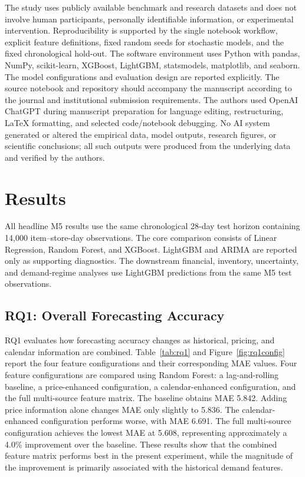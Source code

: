 The study uses publicly available benchmark and research datasets and does not involve human participants, personally identifiable information, or experimental intervention.
Reproducibility is supported by the single notebook workflow, explicit feature definitions, fixed random seeds for stochastic models, and the fixed chronological hold-out.
The software environment uses Python with pandas, NumPy, scikit-learn, XGBoost, LightGBM, statsmodels, matplotlib, and seaborn.
The model configurations and evaluation design are reported explicitly.
The source notebook and repository should accompany the manuscript according to the journal and institutional submission requirements.
The authors used OpenAI ChatGPT during manuscript preparation for language editing, restructuring, LaTeX formatting, and selected code/notebook debugging. No AI system generated or altered the empirical data, model outputs, research figures, or scientific conclusions; all such outputs were produced from the underlying data and verified by the authors.

\section{Results}

All headline M5 results use the same chronological 28-day test horizon containing 14,000 item--store-day observations.
The core comparison consists of Linear Regression, Random Forest, and XGBoost.
LightGBM and ARIMA are reported only as supporting diagnostics.
The downstream financial, inventory, uncertainty, and demand-regime analyses use LightGBM predictions from the same M5 test observations.

\subsection{RQ1: Overall Forecasting Accuracy}

RQ1 evaluates how forecasting accuracy changes as historical, pricing, and calendar information are combined. Table~\ref{tab:rq1} and Figure~\ref{fig:rq1config} report the four feature configurations and their corresponding MAE values.
Four feature configurations are compared using Random Forest: a lag-and-rolling baseline, a price-enhanced configuration, a calendar-enhanced configuration, and the full multi-source feature matrix.
The baseline obtains MAE 5.842.
Adding price information alone changes MAE only slightly to 5.836.
The calendar-enhanced configuration performs worse, with MAE 6.691.
The full multi-source configuration achieves the lowest MAE at 5.608, representing approximately a 4.0\% improvement over the baseline.
These results show that the combined feature matrix performs best in the present experiment, while the magnitude of the improvement is primarily associated with the historical demand features.


